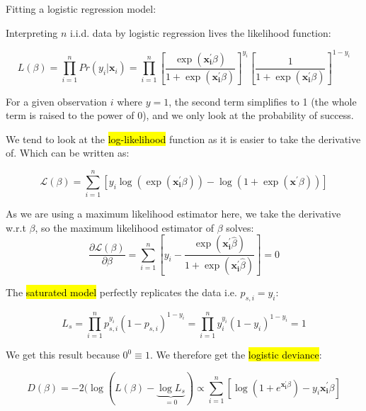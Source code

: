 \documentclass[11pt]{article}
\begin{document}
\begin{procedure}
    Fitting a logistic regression model:

    Interpreting $n$ i.i.d. data by logistic regression lives the likelihood function:

    \begin{equation}
        \label{eq:likelihood}
        L(\beta) = \prod_{i=1}^n Pr(y_i|\mathbf{x}_i) = \prod_{i=1}^n \left[\dfrac{\exp(\mathbf{x_i^\prime}\beta)}{1 + \exp (\mathbf{x_i^\prime}\beta)}\right]^{y_i}\left[\dfrac{1}{1 + \exp (\mathbf{x_i^\prime}\beta)}\right]^{1-y_i}
    \end{equation}

    For a given observation $i$ where $y = 1$, the second term simplifies to 1 (the whole term is raised to the power of 0), and we only look at the probability of success.

    We tend to look at the \hl{log-likelihood} function as it is easier to take the derivative of. Which can be written as:

    \begin{equation}
        \label{eq:log-likelihood function}
         \mathcal{L}(\beta) = \sum_{i=1}^n \left[y_i \log (\exp(\mathbf{x_i^\prime}\beta)) - \log (1 + \exp(\mathbf{x^\prime}\beta))\right]
    \end{equation}

    As we are using a maximum likelihood estimator here, we take the derivative w.r.t $\beta$, so the maximum likelihood estimator of $\beta$ solves:
\begin{equation}
    \label{eq: max likelihood}
    \dfrac{\partial \mathcal{L}(\beta)}{\partial \beta} = \sum_{i=1}^n \left[y_i - \dfrac{\exp(\mathbf{x_i^\prime}\hat{\beta})}{1 + \exp (\mathbf{x_i^\prime}\hat{\beta})}\right] = 0 
\end{equation}
    
\end{procedure}

The \hl{saturated model} perfectly replicates the data i.e. $p_{s,i} = y_i$:

\begin{equation*}
    L_s = \prod_{i=1}^n p_{s,i}^{y_i} (1 - p_{s,i})^{1-y_i} = \prod_{i=1}^n y_{i}^{y_i} (1 - y_{i})^{1-y_i} =1
\end{equation*}

We get this result because $0^0 \equiv 1$. We therefore get the \hl{logistic deviance}:

\begin{equation*}
    D(\beta) = -2(\log(L(\beta) - \underbrace{\log L_s}_{=0}) \propto \sum_{i=1}^n \left[\log(1 + e^{\mathbf{x_i^\prime}\beta}) - y_i \mathbf{x_i^\prime}\beta\right]
\end{equation*}
\end{document}
